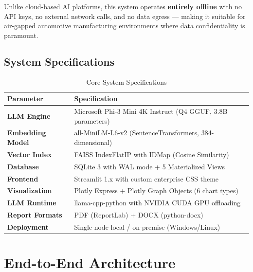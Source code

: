 \documentclass[12pt, a4paper, twoside]{article}
\begin{document}
\begin{keybox}
Unlike cloud-based AI platforms, this system operates \textbf{entirely offline} with no API keys, no external network calls, and no data egress — making it suitable for air-gapped automotive manufacturing environments where data confidentiality is paramount.
\end{keybox}

\subsection{System Specifications}

\begin{table}[H]
\centering
\caption{Core System Specifications}
\label{tab:specs}
\begin{tabularx}{\textwidth}{>{\bfseries\color{darknavy}}l X}
\toprule
\rowcolor{navy}\color{white}\textbf{Parameter} & \color{white}\textbf{Specification} \\
\midrule
LLM Engine         & Microsoft Phi-3 Mini 4K Instruct (Q4 GGUF, 3.8B parameters) \\
Embedding Model    & all-MiniLM-L6-v2 (SentenceTransformers, 384-dimensional) \\
Vector Index       & FAISS IndexFlatIP with IDMap (Cosine Similarity) \\
Database           & SQLite 3 with WAL mode + 5 Materialized Views \\
Frontend           & Streamlit 1.x with custom enterprise CSS theme \\
Visualization      & Plotly Express + Plotly Graph Objects (6 chart types) \\
LLM Runtime        & llama-cpp-python with NVIDIA CUDA GPU offloading \\
Report Formats     & PDF (ReportLab) + DOCX (python-docx) \\
Deployment         & Single-node local / on-premise (Windows/Linux) \\
\bottomrule
\end{tabularx}
\end{table}

\newpage

\section{End-to-End Architecture}
\end{document}
